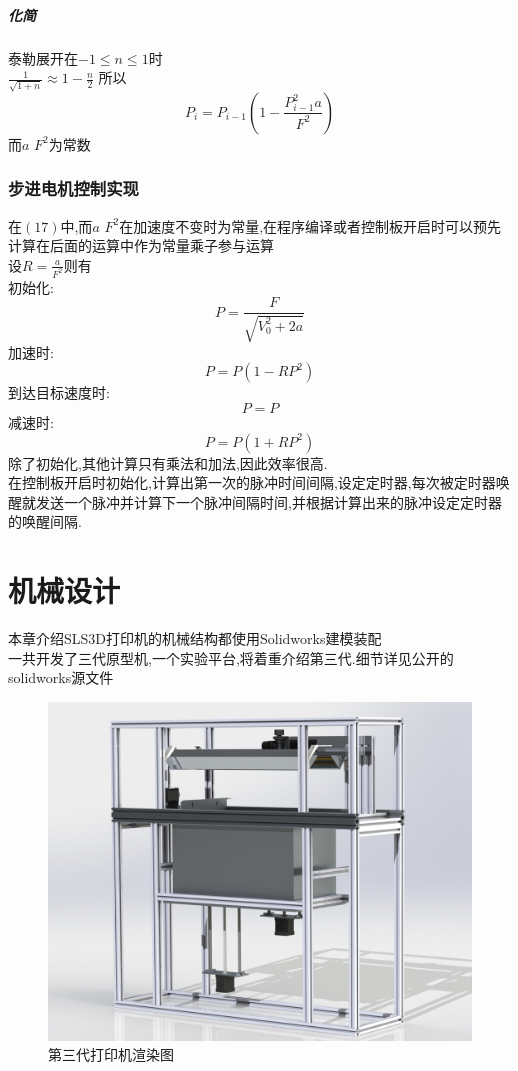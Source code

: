 \documentclass[a4paper,12pt,onecolumn,twoside]{article}
\begin{document}
\subparagraph{化简}泰勒展开在$-1\leq n \leq 1$时
\\$\frac{1}{\sqrt{1+n}}\approx1-\frac{n}{2}$
 所以
\begin{equation}
 P_i=P_{i-1}(1-\frac{P_{i-1}^2a}{F^2})
\end{equation}
而$a$ $F^2$为常数
\subsubsection{步进电机控制实现}
在$(17)$中,而$a$ $F^2$在加速度不变时为常量,在程序编译或者控制板开启时可以预先计算在后面的运算中作为常量乘子参与运算\\设$R=\frac{a}{F^2}$则有\\
初始化:
\begin{equation}
P=\frac{F}{\sqrt{V_0^2+2a}}
\end{equation}
加速时:
\begin{equation}
P=P(1-RP^2)
\end{equation}
到达目标速度时:
\begin{equation}
P=P
\end{equation}
减速时:
\begin{equation}
P=P(1+RP^2)
\end{equation}
除了初始化,其他计算只有乘法和加法,因此效率很高.\\
在控制板开启时初始化,计算出第一次的脉冲时间间隔,设定定时器,每次被定时器唤醒就发送一个脉冲并计算下一个脉冲间隔时间,并根据计算出来的脉冲设定定时器的唤醒间隔.
\newpage
\section{机械设计}
本章介绍SLS3D打印机的机械结构都使用Solidworks建模装配\\
一共开发了三代原型机,一个实验平台,将着重介绍第三代.细节详见公开的solidworks源文件
\begin{figure}[ht]
\centering     
\includegraphics[width=\linewidth]{MGSLS3_0.jpg}
\caption{第三代打印机渲染图}
\end{figure}
\end{document}
